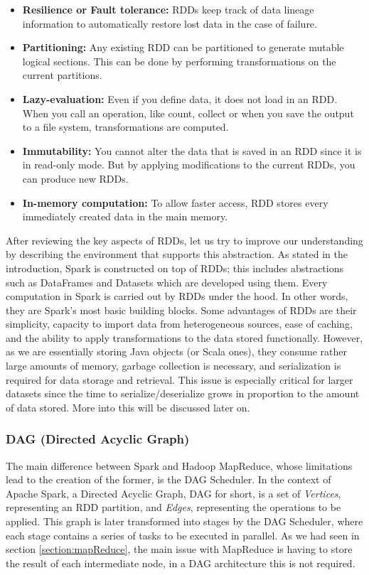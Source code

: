 \begin{itemize}
    \itemsep0.25em
    \item \textbf{Resilience or Fault tolerance:} RDDs keep track of data lineage information to automatically restore lost data in the case of failure.
    \item \textbf{Partitioning:} Any existing RDD can be partitioned to generate mutable logical sections. This can be done by performing transformations on the current partitions.
    \item \textbf{Lazy-evaluation:} Even if you define data, it does not load in an RDD. When you call an operation, like count, collect or when you save the output to a file system, transformations are computed.
    \item \textbf{Immutability:} You cannot alter the data that is saved in an RDD since it is in read-only mode. But by applying modifications to the current RDDs, you can produce new RDDs.
    \item \textbf{In-memory computation:} To allow faster access, RDD stores every immediately created data in the main memory.
\end{itemize}

After reviewing the key aspects of RDDs, let us try to improve our understanding by describing the environment that supports this abstraction. As stated in the introduction, Spark is constructed on top of RDDs; this includes abstractions such as DataFrames and Datasets which are developed using them.  Every computation in Spark is carried out by RDDs under the hood. In other words, they are Spark's most basic building blocks. Some advantages of RDDs are their simplicity, capacity to import data from heterogeneous sources, ease of caching, and the ability to apply transformations to the data stored functionally. However, as we are essentially storing Java objects (or Scala ones), they consume rather large amounts of memory, garbage collection is necessary, and serialization is required for data storage and retrieval. This issue is especially critical for larger datasets since the time to serialize/deserialize grows in proportion to the amount of data stored. More into this will be discussed later on.

\subsubsection{DAG (Directed Acyclic Graph)}

The main difference between Spark and Hadoop MapReduce, whose limitations lead to the creation of the former, is the DAG Scheduler. In the context of Apache Spark, a Directed Acyclic Graph, DAG for short, is a set of \textit{Vertices}, representing an RDD partition, and \textit{Edges}, representing the operations to be applied. This graph is later transformed into stages by the DAG Scheduler, where each stage contains a series of tasks to be executed in parallel. As we had seen in section \ref{section:mapReduce}, the main issue with MapReduce is having to store the result of each intermediate node, in a DAG architecture this is not required.

